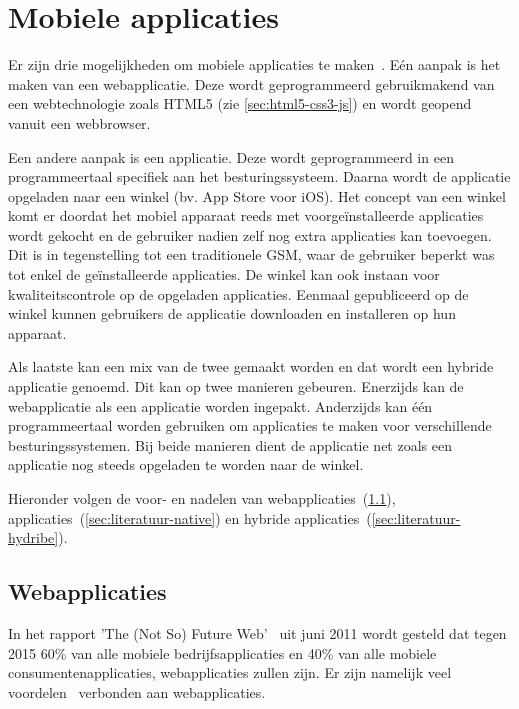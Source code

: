 \section{Mobiele applicaties}
\label{sec:mobiele-applicaties}
Er zijn drie mogelijkheden om mobiele applicaties te maken~\cite{Accenture2012,Hales2012}. Eén aanpak is het maken van een webapplicatie.
Deze wordt geprogrammeerd gebruikmakend van een webtechnologie zoals HTML5 (zie \ref{sec:html5-css3-js}) en wordt geopend vanuit een webbrowser. 

Een andere aanpak is een  applicatie. 
Deze wordt geprogrammeerd in een programmeertaal specifiek aan het besturingssysteem.
Daarna wordt de applicatie opgeladen naar een winkel (bv. App Store voor iOS).
Het concept van een winkel komt er doordat het mobiel apparaat reeds met voorgeïnstalleerde applicaties wordt gekocht en de gebruiker nadien zelf nog extra applicaties kan toevoegen.
Dit is in tegenstelling tot een traditionele GSM, waar de gebruiker beperkt was tot enkel de geïnstalleerde applicaties. 
De winkel kan ook instaan voor kwaliteitscontrole op de opgeladen applicaties.
Eenmaal gepubliceerd op de winkel kunnen gebruikers de applicatie downloaden en installeren op hun apparaat.

Als laatste kan een mix van de twee gemaakt worden en dat wordt een hybride applicatie genoemd.
Dit kan op twee manieren gebeuren.
Enerzijds kan de webapplicatie als een  applicatie worden ingepakt.
Anderzijds kan één programmeertaal worden gebruiken om  applicaties te maken voor verschillende besturingssystemen.
Bij beide manieren dient de applicatie net zoals een  applicatie nog steeds opgeladen te worden naar de winkel.

Hieronder volgen de voor- en nadelen van webapplicaties~(\ref{sec:literatuur-webapps}),  applicaties~(\ref{sec:literatuur-native}) en hybride applicaties~(\ref{sec:literatuur-hydribe}).

\subsection{Webapplicaties}
\label{sec:literatuur-webapps}
In het rapport 'The (Not So) Future Web'~\cite{Phifer2011} uit juni 2011 wordt gesteld dat tegen 2015 60\% van alle mobiele bedrijfsapplicaties en 40\% van alle mobiele consumentenapplicaties, webapplicaties zullen zijn. 
Er zijn namelijk veel voordelen~\cite{Accenture2012} verbonden aan webapplicaties.

